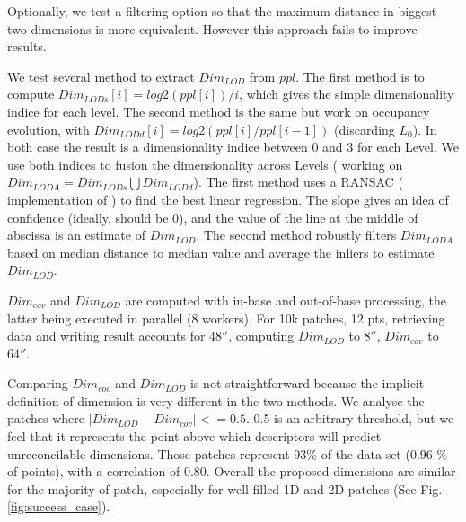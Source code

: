 		Optionally, we test a filtering option so that the maximum distance in biggest two dimensions is more equivalent. However this approach fails to improve results.
		
		We test several method to extract $Dim_{LOD}$ from $ppl$.
		The first method is to compute $ Dim_{LODs}[i] = log2(ppl[i])/i$,
		which gives the simple dimensionality indice for each level.
		The second method is the same but work on occupancy evolution, with
		$Dim_{LODd}[i] = log2(ppl[i]/ppl[i-1])$ (discarding $L_0$).
		In both case the result is a dimensionality indice between 0 and 3 for each Level.
		We use both indices to fusion the dimensionality across Levels (  working on $Dim_{LODA} = Dim_{LODs}\bigcup Dim_{LODd}$).
		The first method uses a RANSAC (\cite{SciPy2014} implementation of \cite{Choi2009}) 
		to find the best linear regression. The slope gives an idea of confidence (ideally, should be 0),
		and the value of the line at the middle of abscissa is an estimate of $Dim_{LOD}$.
		The second method robustly filters $Dim_{LODA}$ based on median distance to median value and
		average the inliers to estimate $Dim_{LOD}$.
		
		$Dim_{cov}$ and $Dim_{LOD}$ are computed with in-base and out-of-base processing, the latter 
		being executed in parallel (8 workers).
		For 10k patches, 12 \mega pts, retrieving data and writing result accounts for $48\second$, computing $Dim_{LOD}$ to $8\second$, $Dim_{cov}$ to $64\second$.
		
		
		
		Comparing $Dim_{cov}$ and $Dim_{LOD}$ is not straightforward because the implicit definition of dimension is very different in the two methods.
		We analyse the patches where $\lvert Dim_{LOD} -  Dim_{cov}\rvert <=0.5$. 
		0.5 is an arbitrary threshold,
		but we feel that it represents the point above which descriptors will predict unreconcilable dimensions.
		Those patches represent 93\% of the data set (0.96 \% of points), with a correlation of 0.80.
		Overall the proposed dimensions are similar for the majority of patch, especially for well filled 1D and 2D patches (See Fig. \ref{fig:success_case}).
		
